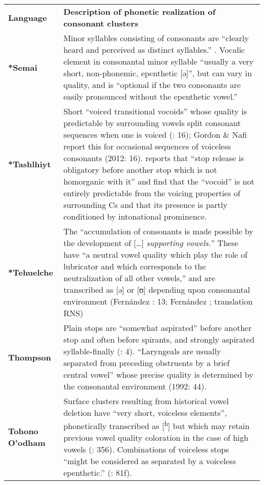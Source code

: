 \begin{table}
\begin{tabularx}{\textwidth}{XX}
\lsptoprule

\textbf{Language} & \textbf{Description of phonetic realization of consonant clusters}\\
\textbf{*Semai} & Minor syllables consisting of consonants are “clearly heard and perceived as distinct syllables.” \citep[321]{Sloan1988}. Vocalic element in consonantal minor syllable “usually a very short, non-phonemic, epenthetic [ə]”, but can vary in quality, and is “optional if the two consonants are easily pronounced without the epenthetic vowel.” \citep[2]{Philips2007}\\
\textbf{*Tashlhiyt} & Short “voiced transitional vocoids” whose quality is predictable by surrounding vowels split consonant sequences when one is voiced (\citealt{DellElmedlaoui2002}: 16); Gordon \& Nafi report this for occasional sequences of voiceless consonants (2012: 16). \citet[210]{Ridouane2008} reports that “stop release is obligatory before another stop which is not homorganic with it” and \citet{GriceEtAl2015} find that the “vocoid” is not entirely predictable from the voicing properties of surrounding Cs and that its presence is partly conditioned by intonational prominence.\\
\textbf{*Tehuelche} & The “accumulation of consonants is made possible by the development of […] \textit{supporting vowels.}” These have “a neutral vowel quality which play the role of lubricator and which corresponds to the neutralization of all other vowels,” and are transcribed as [ə] or [ʊ] depending upon consonantal environment (Fernández \citealt{GarayHernández2006}: 13; Fernández \citealt{Garay1998}; translation RNS)\\
\textbf{Thompson} & Plain stops are “somewhat aspirated” before another stop and often before spirants, and strongly aspirated syllable-finally (\citealt{ThompsonThompson1992}: 4). “Laryngeals are usually separated from preceding obstruents by a brief central vowel” whose precise quality is determined by the consonantal environment (1992: 44).\\
\textbf{Tohono O’odham} & Surface clusters resulting from historical vowel deletion have “very short, voiceless elements”, phonetically transcribed as [\textsuperscript{h}] but which may retain previous vowel quality coloration in the case of high vowels (\citealt{HillZepeda1992}: 356). Combinations of voiceless stops “might be considered as separated by a voiceless epenthetic.” (\citealt{Mason1950}: 81f).\\

\end{tabularx}
\end{table}

